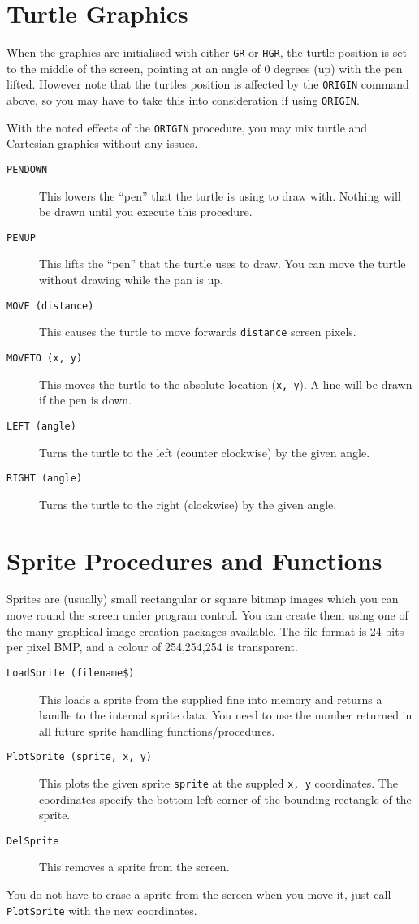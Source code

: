 \section{Turtle Graphics}
When the graphics are initialised with either {\tt GR} or {\tt HGR},
the turtle position is set to the middle of the screen, pointing at
an angle of 0 degrees (up) with the pen lifted. However note that the
turtles position is affected by the {\tt ORIGIN} command above, so you
may have to take this into consideration if using {\tt ORIGIN}.

With the noted effects of the {\tt ORIGIN} procedure,
you may mix turtle and Cartesian graphics without any issues.

\begin{description}
\item[{\tt PENDOWN}]
This lowers the ``pen'' that the turtle is using to draw with. Nothing will
be drawn until you execute this procedure.
\item[{\tt PENUP}]
This lifts the ``pen'' that the turtle uses to draw. You can move the turtle
without drawing while the pan is up.
\item[{\tt MOVE (distance)}]
This causes the turtle to move forwards {\tt distance} screen pixels.
\item[{\tt MOVETO (x, y)}]
This moves the turtle to the absolute location ({\tt x, y}). A line will
be drawn if the pen is down.
\item[{\tt LEFT (angle)}]
Turns the turtle to the left (counter clockwise) by the given angle.
\item[{\tt RIGHT (angle)}]
Turns the turtle to the right (clockwise) by the given angle.
\end{description}

\section{Sprite Procedures and Functions}
Sprites are (usually) small rectangular or square bitmap images which
you can move round the screen under program control. You can create them
using one of the many graphical image creation packages available. The
file-format is 24 bits per pixel BMP, and a colour of 254,254,254 is
transparent.

\begin{description}
\item[{\tt LoadSprite (filename\$)}]
This loads a sprite from the supplied fine into memory and returns a
handle to the internal sprite data. You need to use the number returned
in all future sprite handling functions/procedures.
\item[{\tt PlotSprite (sprite, x, y)}]
This plots the given sprite {\tt sprite} at the suppled {\tt x, y}
coordinates. The coordinates specify the bottom-left corner of the
bounding rectangle of the sprite.
\item[{\tt DelSprite}]
This removes a sprite from the screen.
\end{description}

You do not have to erase a sprite from the screen when you move it,
just call {\tt PlotSprite} with the new coordinates.

